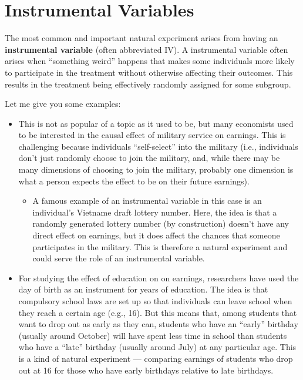\documentclass[
  letterpaper,
  DIV=11,
  numbers=noendperiod]{scrreprt}
\providecommand{\tightlist}{%
  \setlength{\itemsep}{0pt}\setlength{\parskip}{0pt}}\usepackage{longtable,booktabs,array}
\begin{document}
\section{Instrumental Variables}\label{instrumental-variables}

The most common and important natural experiment arises from having an
\textbf{instrumental variable} (often abbreviated IV). A instrumental
variable often arises when ``something weird'' happens that makes some
individuals more likely to participate in the treatment without
otherwise affecting their outcomes. This results in the treatment being
effectively randomly assigned for some subgroup.

Let me give you some examples:

\begin{itemize}
\item
  This is not as popular of a topic as it used to be, but many
  economists used to be interested in the causal effect of military
  service on earnings. This is challenging because individuals
  ``self-select'' into the military (i.e., individuals don't just
  randomly choose to join the military, and, while there may be many
  dimensions of choosing to join the military, probably one dimension is
  what a person expects the effect to be on their future earnings).

  \begin{itemize}
  \tightlist
  \item
    A famous example of an instrumental variable in this case is an
    individual's Vietname draft lottery number. Here, the idea is that a
    randomly generated lottery number (by construction) doesn't have any
    direct effect on earnings, but it does affect the chances that
    someone participates in the military. This is therefore a natural
    experiment and could serve the role of an instrumental variable.
  \end{itemize}
\item
  For studying the effect of education on on earnings, researchers have
  used the day of birth as an instrument for years of education. The
  idea is that compulsory school laws are set up so that individuals can
  leave school when they reach a certain age (e.g., 16). But this means
  that, among students that want to drop out as early as they can,
  students who have an ``early'' birthday (usually around October) will
  have spent less time in school than students who have a ``late''
  birthday (usually around July) at any particular age. This is a kind
  of natural experiment --- comparing earnings of students who drop out
  at 16 for those who have early birthdays relative to late birthdays.
\end{itemize}
\end{document}
